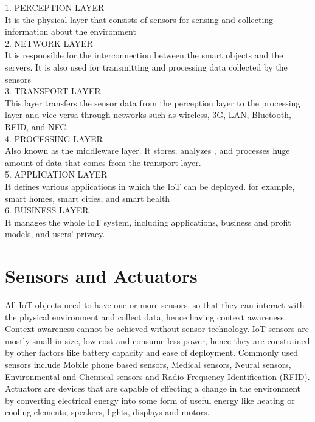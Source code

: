 \documentclass{article}
\begin{document}
1. PERCEPTION LAYER\\
It is the physical layer that consists of sensors for sensing and collecting information about the environment\\

2. NETWORK LAYER\\
It is responsible for the interconnection between the smart objects and the servers. It is also used for transmitting and processing data collected by the sensors\\

3. TRANSPORT LAYER\\
This layer transfers the sensor data from the perception layer to the processing layer and vice versa through networks such as wireless, 3G, LAN, Bluetooth, RFID, and NFC.\\

4. PROCESSING LAYER\\
Also known as the middleware layer. It stores, analyzes , and processes huge amount of data that comes from the transport layer.\\

5. APPLICATION LAYER\\
It defines various applications in which the IoT can be deployed. for example, smart homes, smart cities, and smart health\\

6. BUSINESS LAYER \\
It manages the whole IoT system, including applications, business and profit models, and users’ privacy.\\


\section*{Sensors and Actuators}
All IoT objects need to have one or more sensors, so that they can interact with the physical environment and collect data, hence having context awareness. Context awareness cannot be achieved without sensor technology. IoT sensors are mostly small in size, low cost and consume less power, hence they are constrained by other factors like battery capacity and ease of deployment. Commonly used sensors include Mobile phone based sensors, Medical sensors, Neural sensors, Environmental and Chemical sensors and Radio Frequency Identification (RFID).\\
Actuators are devices that are capable of effecting a change in the environment by converting electrical energy into some form of useful energy like heating or cooling elements, speakers, lights, displays and motors.
\end{document}

